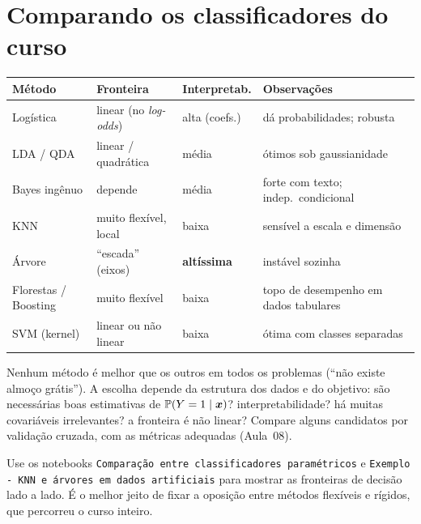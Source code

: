 \documentclass[11pt,a4paper]{article}
\begin{document}
\section{Comparando os classificadores do curso}
\begin{center}\small
\renewcommand{\arraystretch}{1.3}
\begin{tabular}{@{}l>{\raggedright\arraybackslash}p{3.5cm}>{\raggedright\arraybackslash}p{3.2cm}>{\raggedright\arraybackslash}p{3.6cm}@{}}
\toprule
\textbf{Método} & \textbf{Fronteira} & \textbf{Interpretab.} & \textbf{Observações} \\
\midrule
Logística & linear (no \emph{log-odds}) & alta (coefs.) & dá probabilidades; robusta \\
LDA / QDA & linear / quadrática & média & ótimos sob gaussianidade \\
Bayes ingênuo & depende & média & forte com texto; indep.\ condicional \\
KNN & muito flexível, local & baixa & sensível a escala e dimensão \\
Árvore & ``escada'' (eixos) & \textbf{altíssima} & instável sozinha \\
Florestas / Boosting & muito flexível & baixa & topo de desempenho em dados tabulares \\
SVM (kernel) & linear ou não linear & baixa & ótima com classes separadas \\
\bottomrule
\end{tabular}
\end{center}

\begin{ideia}
Nenhum método é melhor que os outros em todos os problemas (``não existe almoço
grátis''). A escolha depende da estrutura dos dados e do objetivo: são necessárias
boas estimativas de $\mathbb{P}(Y=1\mid\bm{x})$? interpretabilidade? há muitas covariáveis irrelevantes? a
fronteira é não linear? Compare alguns candidatos por validação cruzada, com as
métricas adequadas (Aula~08).
\end{ideia}

\begin{emsala}
\raggedright
Use os notebooks \texttt{Comparação entre classificadores paramétricos} e
\texttt{Exemplo - KNN e árvores em dados artificiais} para mostrar as fronteiras de
decisão lado a lado. É o melhor jeito de fixar a oposição entre métodos flexíveis e
rígidos, que percorreu o curso inteiro.
\end{emsala}
\end{document}
